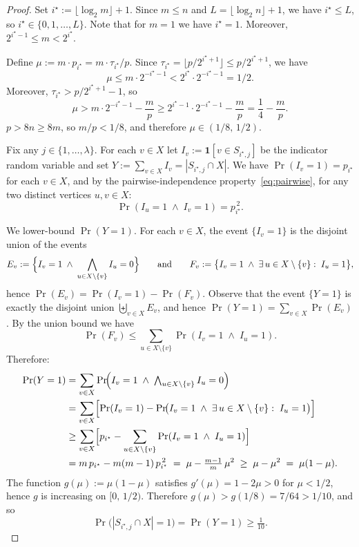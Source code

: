 \begin{proof}
Set $i^\star := \lfloor \log_2 m\rfloor + 1$.
Since $m\le n$ and $L = \lfloor\log_2 n\rfloor + 1$, we have
$i^\star \le L$, so $i^\star\in\{0,1,\dots,L\}$.
Note that for $m=1$ we have $i^\star=1$.
Moreover, $2^{i^\star-1}\le m < 2^{i^\star}$.

Define $\mu := m\cdot p_{i^\star} = m\cdot \tau_{i^\star}/p$.
Since $\tau_{i^\star}=\lfloor p/2^{i^\star+1}\rfloor \le p/2^{i^\star+1}$,
we have
\[
\mu \le m\cdot 2^{-i^\star-1}
< 2^{i^\star}\cdot 2^{-i^\star-1}
= 1/2.
\]
Moreover, $\tau_{i^\star} > p/2^{i^\star+1}-1$, so
\[
\mu > m\cdot 2^{-i^\star-1} - \frac{m}{p}
\ge 2^{i^\star-1}\cdot 2^{-i^\star-1} - \frac{m}{p}
= \frac14 - \frac{m}{p}.
\]
$p>8n\ge 8m$, so $m/p < 1/8$, and therefore
$\mu\in(1/8,\,1/2)$.

Fix any $j\in\{1,\dots,\lambda\}$.
For each $v\in X$ let $I_v := \mathbf{1}[v\in S_{i^\star,j}]$ be the
indicator random variable and set $Y := \sum_{v\in X} I_v
= |S_{i^\star,j}\cap X|$.
We have $\Pr(I_v = 1) = p_{i^\star}$ for each $v\in X$, and by the
pairwise-independence property~\eqref{eq:pairwise}, for any two distinct
vertices $u,v\in X$:
\[
\Pr(I_u = 1 \;\wedge\; I_v = 1) = p_{i^\star}^{\,2}.
\]

We lower-bound $\Pr(Y=1)$.
For each $v\in X$, the event $\{I_v=1\}$ is the disjoint union of the events
\[
E_v := \Bigl\{I_v = 1 \;\wedge\; \bigwedge_{u\in X\setminus\{v\}} I_u=0\Bigr\}
\qquad\text{and}\qquad
F_v := \bigl\{I_v=1\;\wedge\;\exists\,u\in X\setminus\{v\}:\;I_u=1\bigr\},
\]
hence $\Pr(E_v)=\Pr(I_v=1)-\Pr(F_v)$.
Observe that the event $\{Y=1\}$ is exactly the disjoint union
$\biguplus_{v\in X} E_v$, and hence $\Pr(Y=1)=\sum_{v\in X}\Pr(E_v)$.
By the union bound we have
\[
\Pr(F_v) \le \sum_{u\in X\setminus\{v\}} \Pr(I_v=1\;\wedge\;I_u=1).
\]
Therefore:
\begin{align*}
\Pr(Y=1)
&= \sum_{v\in X} \Pr\!\Bigl(I_v=1 \;\wedge\;
\textstyle\bigwedge_{u\in X\setminus\{v\}} I_u=0\Bigr)\\
&= \sum_{v\in X}\Bigl[\Pr(I_v=1)
- \Pr\!\bigl(I_v=1\;\wedge\;\exists\,u\in X\setminus\{v\}:\;I_u=1\bigr)
\Bigr]\\
&\ge \sum_{v\in X}\Bigl[p_{i^\star}
- \sum_{u\in X\setminus\{v\}} \Pr(I_v=1 \;\wedge\; I_u=1)\Bigr]\\
&= m\,p_{i^\star} - m(m-1)\,p_{i^\star}^{\,2}
\;=\; \mu - \tfrac{m-1}{m}\,\mu^2
\;\ge\; \mu - \mu^2
\;=\; \mu(1-\mu).
\end{align*}
The function $g(\mu):=\mu(1-\mu)$ satisfies $g'(\mu)=1-2\mu > 0$ for
$\mu<1/2$, hence $g$ is increasing on $[0,\,1/2)$.
Therefore $g(\mu) > g(1/8) = 7/64 > 1/10$, and so
\[
\Pr\bigl(|S_{i^\star,j}\cap X|=1\bigr)=\Pr(Y=1)\ge \tfrac{1}{10}.
\]


\end{proof}
